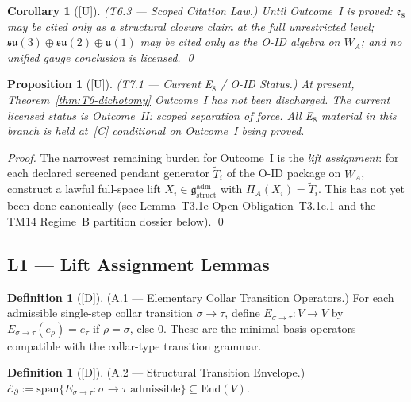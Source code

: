 \documentclass[12pt,oneside]{amsbook}
\theoremstyle{plain}
\newtheorem{proposition}[theorem]{Proposition}
\newtheorem{corollary}[theorem]{Corollary}
\theoremstyle{definition}
\newtheorem{definition}[theorem]{Definition}
\theoremstyle{remark}
\newcommand{\status}[1]{\textup{[#1]}}
\begin{document}
\begin{corollary}[\status{U}]\label{cor:T6-citation}
\textup{(T6.3 --- Scoped Citation Law.)}
Until Outcome~I is proved: $\mathfrak{e}_8$ may be cited only as a structural
closure claim at the full unrestricted level; $\mathfrak{su}(3)\oplus
\mathfrak{su}(2)\oplus\mathfrak{u}(1)$ may be cited only as the O-ID algebra
on $W_A$; and no unified gauge conclusion is licensed. \qed
\end{corollary}

\begin{proposition}[\status{U}]\label{prop:T7-current-status}
\textup{(T7.1 --- Current E$_8$ / O-ID Status.)}
At present, Theorem~\ref{thm:T6-dichotomy} Outcome~I has not been discharged.
The current licensed status is Outcome~II: scoped separation of force. All E$_8$
material in this branch is held at~[C] conditional on Outcome~I being proved.
\end{proposition}

\begin{proof}
The narrowest remaining burden for Outcome~I is the \emph{lift assignment}:
for each declared screened pendant generator $\widetilde{T}_i$ of the O-ID
package on $W_A$, construct a lawful full-space lift
$X_i \in \mathfrak{g}_{\mathrm{struct}}^{\mathrm{adm}}$ with
$\Pi_A(X_i) = \widetilde{T}_i$. This has not yet been done canonically
(see Lemma~T3.1e Open Obligation~T3.1e.1 and the TM14 Regime~B partition
dossier below). \qed
\end{proof}

\subsection{L1 --- Lift Assignment Lemmas}

\begin{definition}[\status{D}]\label{def:elem-collar-ops}
\textup{(A.1 --- Elementary Collar Transition Operators.)}
For each admissible single-step collar transition $\sigma \to \tau$, define
$E_{\sigma \to \tau} : V \to V$ by
$E_{\sigma \to \tau}(e_\rho) = e_\tau$ if $\rho = \sigma$, else $0$.
These are the minimal basis operators compatible with the collar-type
transition grammar.
\end{definition}

\begin{definition}[\status{D}]\label{def:structural-envelope}
\textup{(A.2 --- Structural Transition Envelope.)}
$\mathcal{E}_\partial := \mathrm{span}\{E_{\sigma \to \tau} :
\sigma \to \tau \text{ admissible}\} \subseteq \mathrm{End}(V)$.
\end{definition}
\end{document}
